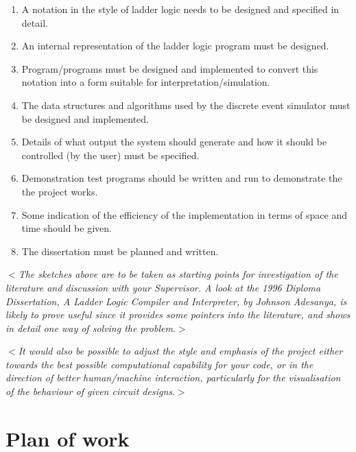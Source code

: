 \documentclass[12pt]{article}
\newcommand{\al}{$<$}
\newcommand{\ar}{$>$}
\begin{document}
\begin{enumerate}

\item A notation in the style of ladder logic needs to be designed and
  specified in detail.

\item An internal representation of the ladder logic program must be
  designed.

\item Program/programs must be designed and implemented to convert
  this notation into a form suitable for interpretation/simulation.

\item The data structures and algorithms used by the discrete event simulator
must be designed and implemented.

\item Details of what output the system should generate and how it
  should be controlled (by the user) must be specified.

\item Demonstration test programs should be written and run to
  demonstrate the the project works.

\item Some indication of the efficiency of the implementation in terms
  of space and time should be given.

\item The dissertation must be planned and written.

\end{enumerate}

\al\emph{The sketches above are to be taken as starting points for
  investigation of the literature and discussion with your Supervisor.
  A look at the 1996 Diploma Dissertation, {\rm A Ladder Logic
    Compiler and Interpreter}, by Johnson Adesanya, is likely to prove
  useful since it provides some pointers into the literature, and
  shows in detail one way of solving the problem}.\ar

\medskip \al\emph{It would also be possible to adjust the style and
  emphasis of the project either towards the best possible
  computational capability for your code, or in the direction of
  better human/machine interaction, particularly for the visualisation
  of the behaviour of given circuit designs}.\ar

\section*{Plan of work}
\end{document}
